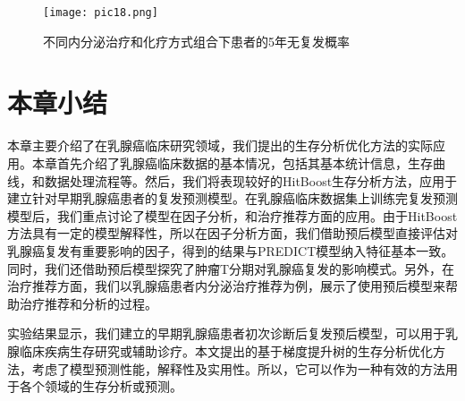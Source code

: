 \begin{figure}[H]
\texttt{[image: pic18.png]}
\caption{不同内分泌治疗和化疗方式组合下患者的5年无复发概率}
\label{pic18}
\end{figure}

\section{本章小结}

本章主要介绍了在乳腺癌临床研究领域，我们提出的生存分析优化方法的实际应用。本章首先介绍了乳腺癌临床数据的基本情况，包括其基本统计信息，生存曲线，和数据处理流程等。然后，我们将表现较好的HitBoost生存分析方法，应用于建立针对早期乳腺癌患者的复发预测模型。在乳腺癌临床数据集上训练完复发预测模型后，我们重点讨论了模型在因子分析，和治疗推荐方面的应用。由于HitBoost方法具有一定的模型解释性，所以在因子分析方面，我们借助预后模型直接评估对乳腺癌复发有重要影响的因子，得到的结果与PREDICT模型纳入特征基本一致。同时，我们还借助预后模型探究了肿瘤T分期对乳腺癌复发的影响模式。另外，在治疗推荐方面，我们以乳腺癌患者内分泌治疗推荐为例，展示了使用预后模型来帮助治疗推荐和分析的过程。

实验结果显示，我们建立的早期乳腺癌患者初次诊断后复发预后模型，可以用于乳腺临床疾病生存研究或辅助诊疗。本文提出的基于梯度提升树的生存分析优化方法，考虑了模型预测性能，解释性及实用性。所以，它可以作为一种有效的方法用于各个领域的生存分析或预测。
